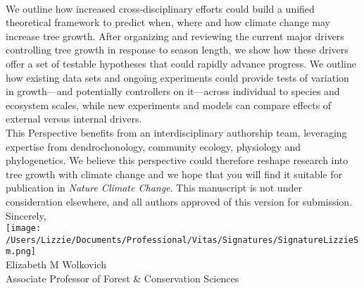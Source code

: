 \documentclass[11pt,a4paper]{article}
\begin{document}
\vspace{1.5ex}\\
We outline how increased cross-disciplinary efforts could build a unified theoretical framework to predict when, where and how climate change may increase tree growth. After organizing and reviewing the current major drivers controlling tree growth in response to season length, we show how these drivers offer a set of testable hypotheses that could rapidly advance progress. We outline how existing data sets and ongoing experiments could provide tests of variation in growth---and potentially controllers on it---across individual to species and ecosystem scales, while new experiments and models can compare effects of external versus internal drivers. 
\vspace{1.5ex}\\
This Perspective benefits from an interdisciplinary authorship team, leveraging expertise from dendrochonology, community ecology, physiology and phylogenetics. We believe this perspective could therefore reshape research into tree growth with climate change and we hope that you will find it suitable for publication in \emph{Nature Climate Change}. This manuscript is not under consideration elsewhere, and all authors approved of this version for submission. 
\vspace{1.5ex}\\
Sincerely,\\

\texttt{[image: /Users/Lizzie/Documents/Professional/Vitas/Signatures/SignatureLizzieSm.png]} \\

\noindent Elizabeth M Wolkovich\\
Associate Professor of Forest \& Conservation Sciences\\ 

\newpage

\end{document}
